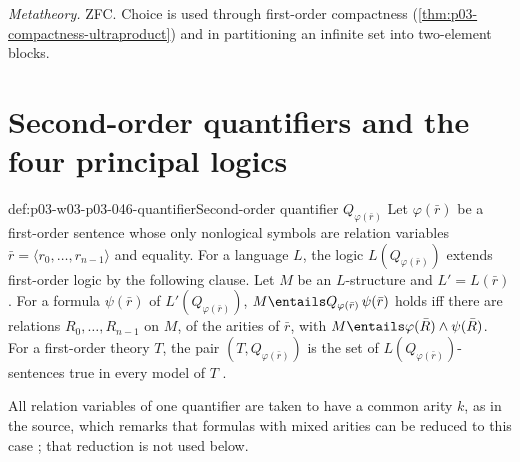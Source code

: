 \emph{Metatheory.} ZFC. Choice is used through first-order compactness
(\cref{thm:p03-compactness-ultraproduct}) and in partitioning an infinite set into
two-element blocks.

\section{Second-order quantifiers and the four principal logics}
\label{sec:p03-w03-p03-046-quantifiers}

\begin{hbdefinition}{def:p03-w03-p03-046-quantifier}{Second-order quantifier \(Q_{\varphi(\bar r)}\)}
Let \(\varphi(\bar r)\) be a first-order sentence whose only nonlogical
symbols are relation variables \(\bar r=\langle r_0,\dots,r_{n-1}\rangle\)
and equality. For a language \(L\), the logic \(L(Q_{\varphi(\bar r)})\)
extends first-order logic by the following clause. Let \(M\) be an
\(L\)-structure and \(L'=L(\bar r)\). For a formula \(\psi(\bar r)\) of
\(L'(Q_{\varphi(\bar r)})\),
\(M\entails Q_{\varphi(\bar r)}\,\psi(\bar r)\) holds iff there are
relations \(R_0,\dots,R_{n-1}\) on \(M\), of the arities of \(\bar r\),
with \(M\entails\varphi(\bar R)\wedge\psi(\bar R)\).
For a first-order theory \(T\), the pair \((T,Q_{\varphi(\bar r)})\) is the
set of \(L(Q_{\varphi(\bar r)})\)-sentences true in every model of \(T\)
\cite[p.~239, Definition~2.1.1]{BaldwinShelah1985}.
\end{hbdefinition}

All relation variables of one quantifier are taken to have a common arity
\(k\), as in the source, which remarks that formulas with mixed arities can
be reduced to this case \cite[p.~239]{BaldwinShelah1985}; that reduction
is not used below.

